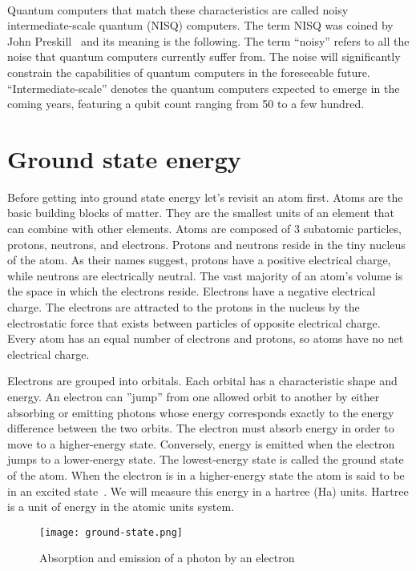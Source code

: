 \paragraph{}
Quantum computers that match these characteristics are called noisy intermediate-scale quantum (NISQ) computers. The term NISQ was coined by John Preskill~\cite{preskill_nisq} and its meaning is the following. The term ``noisy'' refers to all the noise that quantum computers currently suffer from. The noise will significantly constrain the capabilities of quantum computers in the foreseeable future. ``Intermediate-scale'' denotes the quantum computers expected to emerge in the coming years, featuring a qubit count ranging from 50 to a few hundred. 

\section{Ground state energy}
Before getting into ground state energy let's revisit an atom first. Atoms are the basic building blocks of matter. They are the smallest units of an element that can combine with other elements. Atoms are composed of 3 subatomic particles, protons, neutrons, and electrons. Protons and neutrons reside in the tiny nucleus of the atom. As their names suggest, protons have a positive electrical charge, while neutrons are electrically neutral. The vast majority of an atom's volume is the space in which the electrons reside. Electrons have a negative electrical charge. The electrons are attracted to the protons in the nucleus by the electrostatic force that exists between particles of opposite electrical charge. Every atom has an equal number of electrons and protons, so atoms have no net electrical charge.

Electrons are grouped into orbitals. Each orbital has a characteristic shape and energy. An electron can ''jump'' from one allowed orbit to another by either absorbing or emitting photons whose energy corresponds exactly to the energy difference between the two orbits. The electron must absorb energy in order to move to a higher-energy state. Conversely, energy is emitted when the electron jumps to a lower-energy state. The lowest-energy state is called the ground state of the atom. When the electron is in a higher-energy state the atom is said to be in an excited state~\cite{chemistry}. We will measure this energy in a hartree (Ha) units. Hartree is a unit of energy in the atomic units system.~\cite{hartree}

\begin{figure}[H]
    \centering
    \texttt{[image: ground-state.png]}
    \caption{Absorption and emission of a photon by an electron~\cite{ground-state-picture}}
\end{figure}


